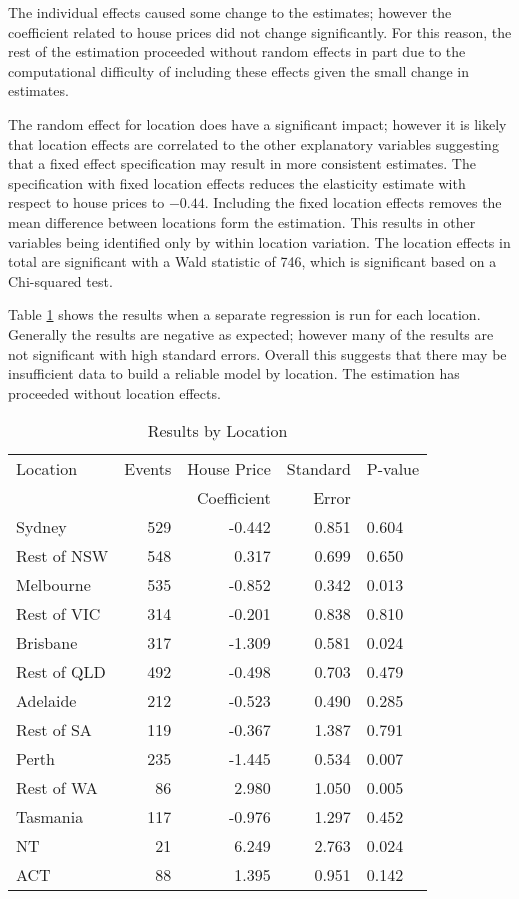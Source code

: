 \documentclass[12pt]{article}
\begin{document}
The individual effects caused some change to the estimates; however the coefficient related to house prices did not change significantly.  For this reason, the rest of the estimation proceeded without random effects in part due to the computational difficulty of including these effects given the small change in estimates.

The random effect for location does have a significant impact; however it is likely that location effects are correlated to the other explanatory variables suggesting that a fixed effect specification may result in more consistent estimates. The specification with fixed location effects reduces the elasticity estimate with respect to house prices  to $-0.44$. Including the fixed location effects removes the mean difference between locations form the estimation. This results in other variables being identified only by within location variation. The location effects in total are significant with a Wald statistic of 746, which is significant based on a Chi-squared test.

Table \ref{ModLoc} shows the results when a separate regression is run for each location. Generally the results are negative as expected; however many of the results are not significant with high standard errors. Overall this suggests that there may be insufficient data to build a reliable model by location. The estimation has proceeded without location effects.

\begin{table}[htbp]
  \centering
    \caption{Results by Location}
    \label{ModLoc}
    \tabularnewline
    \begin{tabular}{@{}lrrrl@{}}
      \toprule
      Location & Events & House Price  & Standard & P-value \tabularnewline
       &  & Coefficient & Error &  \tabularnewline
      \midrule
      Sydney & 529 & -0.442 & 0.851 & 0.604 \\
        Rest of NSW & 548 & 0.317 & 0.699 & 0.650 \\
        Melbourne & 535 & -0.852 & 0.342 & 0.013 \\
        Rest of VIC & 314 & -0.201 & 0.838 & 0.810 \\
        Brisbane & 317 & -1.309 & 0.581 & 0.024 \\
        Rest of QLD & 492 & -0.498 & 0.703 & 0.479 \\
        Adelaide & 212 & -0.523 & 0.490 & 0.285 \\
        Rest of SA & 119 & -0.367 & 1.387 & 0.791 \\
        Perth & 235 & -1.445 & 0.534 & 0.007 \\
        Rest of WA & 86 & 2.980 & 1.050 & 0.005 \\
        Tasmania & 117 & -0.976 & 1.297 & 0.452 \\
        NT & 21 & 6.249 & 2.763 & 0.024 \\
        ACT & 88 & 1.395 & 0.951 & 0.142 \\
      \bottomrule
    \end{tabular}
\end{table}
\end{document}
